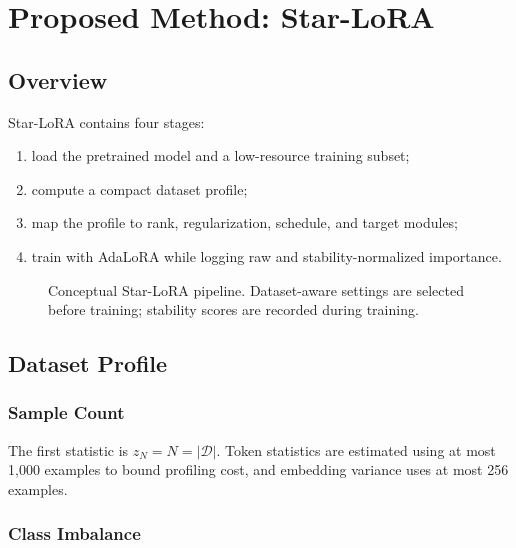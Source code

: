 \chapter{Proposed Method: Star-LoRA}
\label{chap:method}

\section{Overview}

Star-LoRA contains four stages:
\begin{enumerate}
  \item load the pretrained model and a low-resource training subset;
  \item compute a compact dataset profile;
  \item map the profile to rank, regularization, schedule, and target modules;
  \item train with AdaLoRA while logging raw and stability-normalized importance.
\end{enumerate}

\begin{figure}[H]
  \centering
  \caption{Conceptual Star-LoRA pipeline. Dataset-aware settings are selected before training;
  stability scores are recorded during training.}
  \label{fig:pipeline}
\end{figure}

\section{Dataset Profile}

\subsection{Sample Count}

The first statistic is $z_N=N=|\mathcal{D}|$. Token statistics are estimated using at most 1,000
examples to bound profiling cost, and embedding variance uses at most 256 examples.

\subsection{Class Imbalance}

